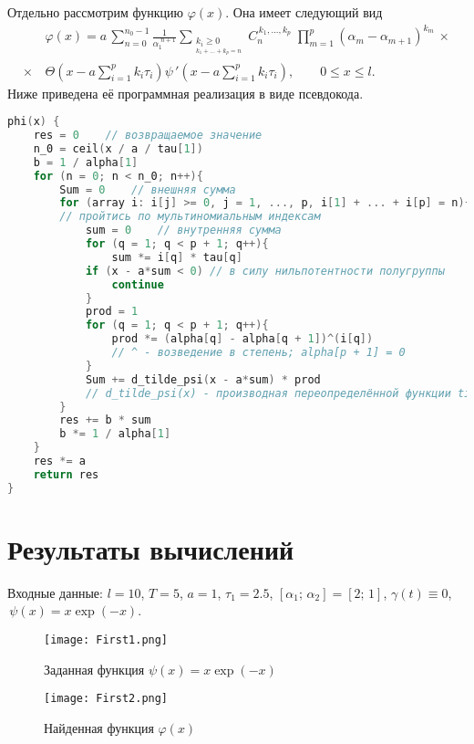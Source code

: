 \documentclass{article}
\renewcommand{\le}{\leqslant}
\renewcommand{\ge}{\geqslant}
\theoremstyle{definition}
\begin{document}
Отдельно рассмотрим функцию $\varphi(x)$. Она имеет следующий вид 
\begin{equation*}
\begin{aligned}
	& \varphi(x) = a\,\sum\limits_{n = 0}^{n_0 - 1} \frac{1}{\alpha_1^{\,\,n + 1}}
	\sum\limits_{\substack{{k_i \ge 0} \\_{k_1 + ... + k_p = n}}}\!\!\!\!C_n^{\,k_1, ..., k_p}\;
	\prod_{m = 1}^{p}(\alpha_m - \alpha_{m + 1})^{k_m} \,\times \\[2mm] \times\,
	& \Theta\left(x - a\sum\limits_{i = 1}^{p}k_i\tau_i \right)\psi\,'\left(x - a\sum\limits_{i = 1}^{p}k_i\tau_i\right), 
	\qquad 0 \le x \le l.
\end{aligned}
\end{equation*}
Ниже приведена её программная реализация в виде псевдокода.
\begin{lstlisting}[language=C]
phi(x) {
	res = 0    // возвращаемое значение
	n_0 = ceil(x / a / tau[1])
	b = 1 / alpha[1]
	for (n = 0; n < n_0; n++){
		Sum = 0    // внешняя сумма
		for (array i: i[j] >= 0, j = 1, ..., p, i[1] + ... + i[p] = n){    
		// пройтись по мультиномиальным индексам
			sum = 0    // внутренняя сумма
			for (q = 1; q < p + 1; q++){
				sum *= i[q] * tau[q]
			if (x - a*sum < 0) // в силу нильпотентности полугруппы
				continue 
			}
			prod = 1
			for (q = 1; q < p + 1; q++){
				prod *= (alpha[q] - alpha[q + 1])^(i[q])    
				// ^ - возведение в степень; alpha[p + 1] = 0
			}
			Sum += d_tilde_psi(x - a*sum) * prod    
			// d_tilde_psi(x) - производная переопределённой функции tilde_psi(x)
		} 
		res += b * sum
		b *= 1 / alpha[1]
	}
	res *= a
	return res
}

\end{lstlisting}

\newpage

\section{Результаты вычислений}

Входные данные:
$l = 10$,  $T = 5$,  $a = 1$, $\tau_1 = 2.5$, $[\alpha_1;\, \alpha_2] = [2;\, 1]$, 
$\gamma(t) \equiv 0$, $\,\psi(x) = x\exp(-x)$.
\begin{figure}[H]
	\centering
	\texttt{[image: First1.png]}
	\caption{Заданная функция $\psi(x) = x\exp(-x)$}
	\label{fig:image1}
\end{figure}

\begin{figure}[H]
	\centering
	\texttt{[image: First2.png]}
	\caption{Найденная функция $\varphi(x)$}
	\label{fig:image2}
\end{figure}
\end{document}
